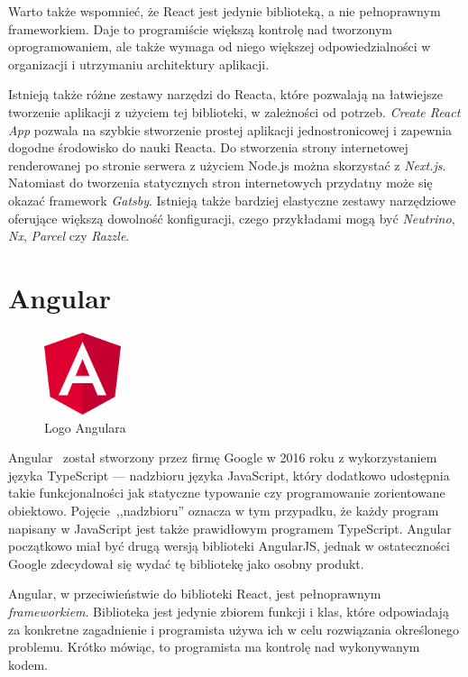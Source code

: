 \documentclass[twoside,a4paper]{report}
\begin{document}
Warto także wspomnieć, że React jest jedynie biblioteką, a nie pełnoprawnym frameworkiem.
Daje to programiście większą kontrolę nad tworzonym oprogramowaniem, ale także wymaga od niego większej odpowiedzialności w organizacji i utrzymaniu architektury aplikacji.

Istnieją także różne zestawy narzędzi do Reacta, które pozwalają na łatwiejsze tworzenie aplikacji z użyciem tej biblioteki, w zależności od potrzeb.
\textit{Create React App} pozwala na szybkie stworzenie prostej aplikacji jednostronicowej i zapewnia dogodne środowisko do nauki Reacta.
Do stworzenia strony internetowej renderowanej po stronie serwera z użyciem Node.js można skorzystać z \textit{Next.js}.
Natomiast do tworzenia statycznych stron internetowych przydatny może się okazać framework \textit{Gatsby}.
Istnieją także bardziej elastyczne zestawy narzędziowe oferujące większą dowolność konfiguracji, czego przykładami mogą być \textit{Neutrino}, \textit{Nx}, \textit{Parcel} czy \textit{Razzle}.

\section{Angular}
\begin{figure}
    \centering
    \includegraphics[width=0.2\textwidth]{img/logo_angular.png}
    \caption*{Logo Angulara}\label{fig:logo_angular}
\end{figure}
Angular~\cite{angulardocs} został stworzony przez firmę Google w 2016 roku z wykorzystaniem języka TypeScript --- nadzbioru języka JavaScript, który dodatkowo udostępnia takie funkcjonalności jak statyczne typowanie czy programowanie zorientowane obiektowo.
Pojęcie~,,nadzbioru'' oznacza w tym przypadku, że każdy program napisany w JavaScript jest także prawidłowym programem TypeScript.
Angular początkowo miał być drugą wersją biblioteki AngularJS, jednak w ostateczności Google zdecydował się wydać tę bibliotekę jako osobny produkt.

Angular, w przeciwieństwie do biblioteki React, jest pełnoprawnym \textit{frameworkiem}.
Biblioteka jest jedynie zbiorem funkcji i klas, które odpowiadają za konkretne zagadnienie i programista używa ich w celu rozwiązania określonego problemu.
Krótko mówiąc, to programista ma kontrolę nad wykonywanym kodem.
\end{document}
